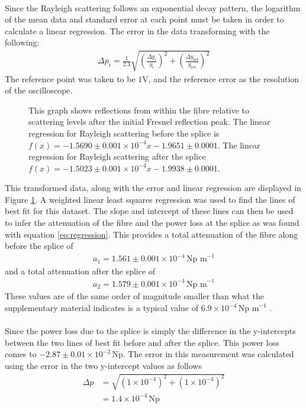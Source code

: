 \paragraph*{}
Since the Rayleigh scattering follows an exponential decay pattern, the logarithm of the mean data and standard error at each point must be taken in order to calculate a linear regression. 
The error in the data transforming with the following:
\begin{align*}
	\Delta p_i = \frac{1}{2.3}
	\sqrt{ 
	\left( \frac{\Delta y_i}{y_i} \right) ^2 + 
	\left( \frac{\Delta y_{\text{ref}}}{y_{\text{ref}}} \right) ^2 }
\end{align*}
The reference point was taken to be $1$V, and the reference error as the resolution of the oscilloscope.
\begin{figure}[h]
	\centering
	
	\caption{\small This graph shows reflections from within the fibre relative to scattering levels after the initial Fresnel reflection peak.
	The linear regression for Rayleigh scattering before the splice is $f(x) = -1.5690 \pm 0.001 \times 10^{-4} x - 1.9651 \pm 0.0001$.
	The linear regression for Rayleigh scattering after the splice 
$f(x) = -1.5023 \pm 0.001 \times 10^{-4} x - 1.9938 \pm 0.0001$.  }
	\label{fig:relvdist}
\end{figure}
This transformed data, along with the error and linear regression are displayed in Figure \ref{fig:relvdist}. A weighted linear least squares regression was used to find the lines of best fit for this dataset. 
The slope and intercept of these lines can then be used to infer the attenuation of the fibre and the power loss at the splice as was found with equation \eqref{eq:regression}.
This provides a total attenuation of the fibre along before the splice of
\begin{align*}
	a_1 = 1.561 \pm 0.001 \times 10^{-4}\, \text{Np m}^{-1}
\end{align*}
and a total attenuation after the splice of
\begin{align*}
	a_2 = 1.579 \pm 0.001 \times 10^{-4}\, \text{Np m}^{-1}
\end{align*}
These values are of the same order of magnitude smaller than what the supplementary material indicates is a typical value of $6.9 \times 10^{-4} \, \text{Np m}^{-1}$ \cite{supnotes}.

\paragraph*{}
Since the power loss due to the splice is simply the difference in the y-intercepts between the two lines of best fit before and after the splice.
This power loss comes to $-2.87 \pm 0.01 \times 10^{-2}\,\text{Np}$.
The error in this measurement was calculated using the error in the two y-intercept values as follows
\begin{align*}
	\Delta p &= \sqrt{(1\times 10^{-4})^2 + (1\times 10^{-4})^2}	\\
		&= 1.4 \times 10^{-4} \,\text{Np}
\end{align*}

